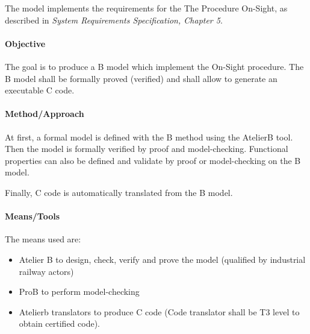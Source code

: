 The model implements the requirements for the The Procedure On-Sight, as described in {\itshape System Requirements Specification, Chapter 5}.



\paragraph{Objective}


The goal is to produce a B model which implement the On-Sight procedure.
The B model shall be formally proved (verified) and shall allow to generate an executable C code.



\paragraph{Method/Approach}

At first, a formal model is defined with the B method using the AtelierB  tool.
Then the model is formally verified by proof and model-checking.
Functional properties can also be defined and validate by proof or model-checking on the B model.

Finally, C code is automatically translated from the B model.

\paragraph{Means/Tools}


The means used are:
\begin{itemize}
\item Atelier B to  design, check, verify and prove the model (qualified by industrial railway actors)
\item ProB to perform model-checking
\item Atelierb translators to produce C code (Code translator shall be T3 level to obtain certified code).
\end{itemize}



